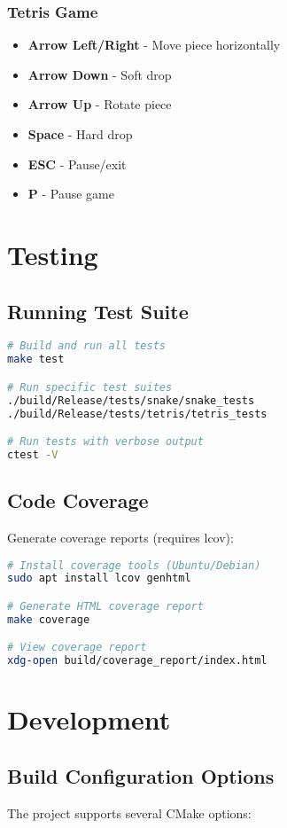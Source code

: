 \documentclass[12pt]{article}
\begin{document}
\subsubsection{Tetris Game}
\begin{itemize}
    \item \textbf{Arrow Left/Right} - Move piece horizontally
    \item \textbf{Arrow Down} - Soft drop
    \item \textbf{Arrow Up} - Rotate piece
    \item \textbf{Space} - Hard drop
    \item \textbf{ESC} - Pause/exit
    \item \textbf{P} - Pause game
\end{itemize}

\section{Testing}

\subsection{Running Test Suite}
\begin{lstlisting}[language=bash]
# Build and run all tests
make test

# Run specific test suites
./build/Release/tests/snake/snake_tests
./build/Release/tests/tetris/tetris_tests

# Run tests with verbose output
ctest -V
\end{lstlisting}

\subsection{Code Coverage}
Generate coverage reports (requires lcov):
\begin{lstlisting}[language=bash]
# Install coverage tools (Ubuntu/Debian)
sudo apt install lcov genhtml

# Generate HTML coverage report
make coverage

# View coverage report
xdg-open build/coverage_report/index.html
\end{lstlisting}

\section{Development}

\subsection{Build Configuration Options}
The project supports several CMake options:
\end{document}
